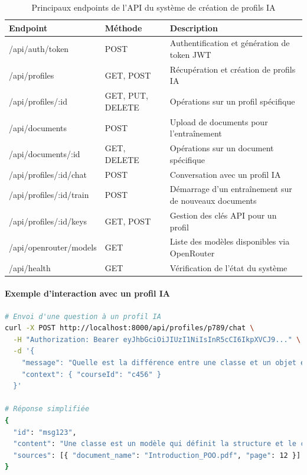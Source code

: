 \begin{table}[H]
\centering
\renewcommand{\arraystretch}{1.2}
\begin{tabular}{|p{4.5cm}|p{2cm}|p{7.5cm}|}
\hline
\textbf{Endpoint} & \textbf{Méthode} & \textbf{Description} \\
\hline
/api/auth/token & POST & Authentification et génération de token JWT \\
\hline
/api/profiles & GET, POST & Récupération et création de profils IA \\
\hline
/api/profiles/:id & GET, PUT, DELETE & Opérations sur un profil spécifique \\
\hline
/api/documents & POST & Upload de documents pour l'entraînement \\
\hline
/api/documents/:id & GET, DELETE & Opérations sur un document spécifique \\
\hline
/api/profiles/:id/chat & POST & Conversation avec un profil IA \\
\hline
/api/profiles/:id/train & POST & Démarrage d'un entraînement sur de nouveaux documents \\
\hline
/api/profiles/:id/keys & GET, POST & Gestion des clés API pour un profil \\
\hline
/api/openrouter/models & GET & Liste des modèles disponibles via OpenRouter \\
\hline
/api/health & GET & Vérification de l'état du système \\
\hline
\end{tabular}
\caption{Principaux endpoints de l'API du système de création de profils IA}
\label{tab:ai_api_endpoints}
\end{table}

\paragraph{Exemple d'interaction avec un profil IA}

\begin{lstlisting}[style=codestyle, language=bash]
# Envoi d'une question à un profil IA
curl -X POST http://localhost:8000/api/profiles/p789/chat \
  -H "Authorization: Bearer eyJhbGciOiJIUzI1NiIsInR5cCI6IkpXVCJ9..." \
  -d '{
    "message": "Quelle est la différence entre une classe et un objet en POO?",
    "context": { "courseId": "c456" }
  }'

# Réponse simplifiée
{
  "id": "msg123",
  "content": "Une classe est un modèle qui définit la structure et le comportement. Un objet est une instance concrète d'une classe qui occupe de l'espace mémoire.",
  "sources": [{ "document_name": "Introduction_POO.pdf", "page": 12 }]
}
\end{lstlisting}

